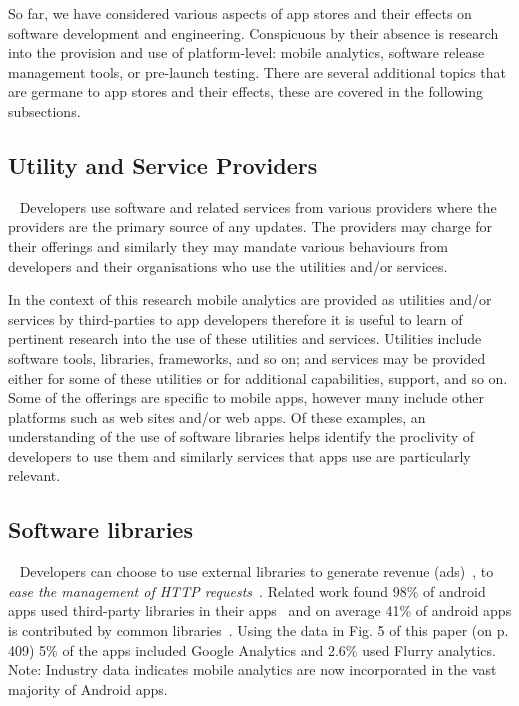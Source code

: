 %
So far, we have considered various aspects of app stores and their effects on software development and engineering. Conspicuous by their absence is research into the provision and use of platform-level: mobile analytics, software release management tools, or pre-launch testing. There are several additional topics that are germane to app stores and their effects, these are covered in the following subsections.


\subsection{Utility and Service Providers}~\label{rw-utility-and-service-providers-topic}
Developers use software and related services from various providers where the providers are the primary source of any updates. The providers may charge for their offerings and similarly they may mandate various behaviours from developers and their organisations who use the utilities and/or services.

In the context of this research mobile analytics are provided as utilities and/or services by third-parties to app developers therefore it is useful to learn of pertinent research into the use of these utilities and services. Utilities include software tools, libraries, frameworks, and so on; and services may be provided either for some of these utilities or for additional capabilities, support, and so on. Some of the offerings are specific to mobile apps, however many include other platforms such as web sites and/or web apps. Of these examples, an understanding of the use of software libraries helps identify the proclivity of developers to use them and similarly services that apps use are particularly relevant.


\subsection{Software libraries}~\label{rw-software-libraries-topic}
Developers can choose to use external libraries to generate revenue (ads)~, to \emph{ease the management of HTTP requests}~. Related work found 98\% of android apps used third-party libraries in their apps~ and on average 41\% of android apps is contributed by common libraries~. Using the data in Fig. 5 of this paper (on p. 409) 5\% of the apps included Google Analytics and 2.6\% used Flurry analytics. Note: Industry data indicates mobile analytics are now incorporated in the vast majority of Android apps.  

